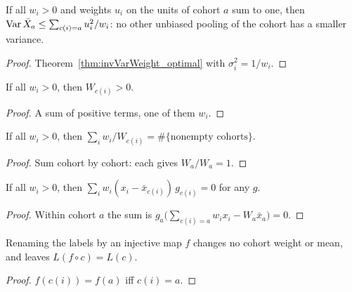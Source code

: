 \begin{lemma}\label{lem:poolVar_le}
  \leanok
  If all $w_i > 0$ and weights $u_i$ on the units of cohort $a$ sum to one,
  then $\operatorname{Var} \bar X_a \le \sum_{c(i)=a} u_i^2 / w_i$: no other unbiased
  pooling of the cohort has a smaller variance.
\end{lemma}
\begin{proof}
  \leanok
  Theorem~\ref{thm:invVarWeight_optimal} with $\sigma_i^2 = 1/w_i$.
\end{proof}

\begin{lemma}\label{lem:groupWeight_pos}
  \leanok
  If all $w_i > 0$, then $W_{c(i)} > 0$.
\end{lemma}
\begin{proof}
  \leanok
  A sum of positive terms, one of them $w_i$.
\end{proof}

\begin{lemma}\label{lem:sum_div_groupWeight}
  \leanok
  If all $w_i > 0$, then $\sum_i w_i / W_{c(i)} = \#\{\text{nonempty cohorts}\}$.
\end{lemma}
\begin{proof}
  \leanok
  Sum cohort by cohort: each gives $W_a / W_a = 1$.
\end{proof}

\begin{lemma}\label{lem:sum_mul_sub_cohortMean}
  \leanok
  If all $w_i > 0$, then $\sum_i w_i (x_i - \bar x_{c(i)})\, g_{c(i)} = 0$
  for any $g$.
\end{lemma}
\begin{proof}
  \leanok
  Within cohort $a$ the sum is $g_a\bigl(\sum_{c(i)=a} w_i x_i - W_a \bar x_a\bigr) = 0$.
\end{proof}

\begin{lemma}\label{lem:poolLoss_comp}
  \leanok
  Renaming the labels by an injective map $f$ changes no cohort weight or
  mean, and leaves $L(f \circ c) = L(c)$.
\end{lemma}
\begin{proof}
  \leanok
  $f(c(i)) = f(a)$ iff $c(i) = a$.
\end{proof}

